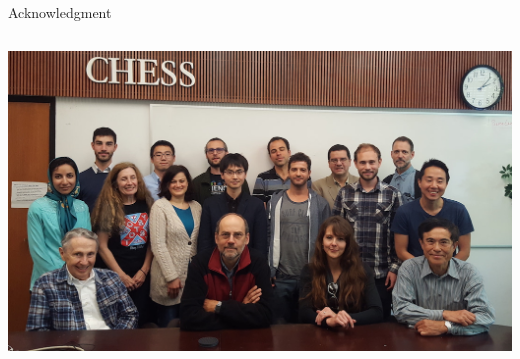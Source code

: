 \begin{frame}{Acknowledgment}
\begin{columns}
    \includegraphics[width=0.9\linewidth]{figures/ptolemy_group.jpg}
  \end{columns}

\end{frame}

